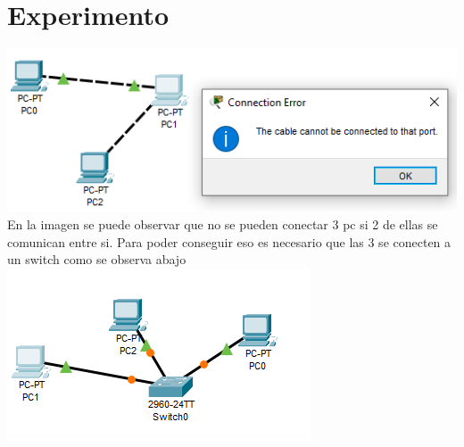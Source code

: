 \documentclass{article}
\begin{document}
    \section{Experimento}
         \includegraphics[width=\textwidth]{img/Experimento.PNG}
         En la imagen se puede observar que no se pueden conectar 3 pc si 2 de ellas se comunican entre si. Para poder conseguir eso es necesario que las 3 se conecten a un switch como se observa abajo
        \includegraphics[width=\textwidth]{img/Conectar PCS.PNG}
    \pagestyle{plain}
\end{document}
